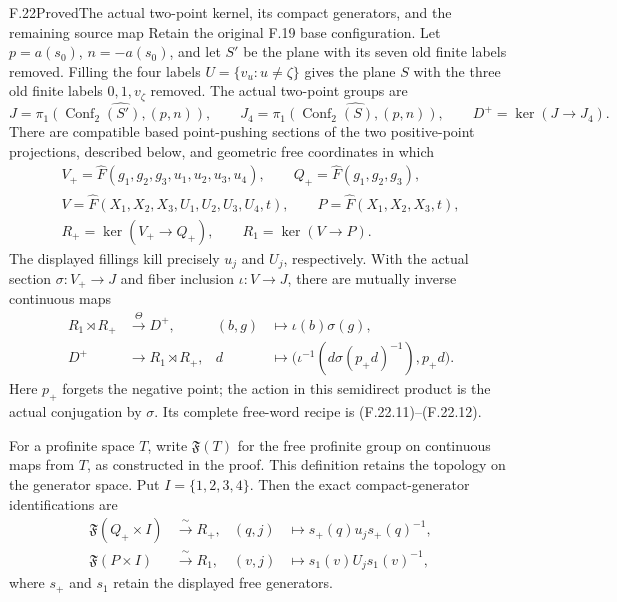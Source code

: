 \begin{claim}{F.22}{Proved}{The actual two-point kernel, its compact generators, and the remaining source map}
Retain the original F.19 base configuration. Let $p=a(s_0)$,
$n=-a(s_0)$, and let $S'$ be the plane with its seven old
finite labels removed. Filling the four labels
$U=\{v_u:u\ne\zeta\}$ gives the plane $S$ with the three
old finite labels $0,1,v_\zeta$ removed. The actual
two-point groups are
\[
 J=\widehat{\pi_1(\operatorname{Conf}_2(S'),(p,n))},\qquad
 J_4=\widehat{\pi_1(\operatorname{Conf}_2(S),(p,n))},\qquad
 D^+=\ker(J\to J_4).
                                                               \tag{F.22.1}
\]
There are compatible based point-pushing sections of the
two positive-point projections, described below, and
geometric free coordinates in which
\[
 \begin{gathered}
 V_+=\widehat F(g_1,g_2,g_3,u_1,u_2,u_3,u_4),\qquad
 Q_+=\widehat F(g_1,g_2,g_3),\\
 V=\widehat F(X_1,X_2,X_3,U_1,U_2,U_3,U_4,t),\qquad
 P=\widehat F(X_1,X_2,X_3,t),\\
 R_+=\ker(V_+\to Q_+),\qquad R_1=\ker(V\to P).
 \end{gathered}                                                \tag{F.22.2}
\]
The displayed fillings kill precisely $u_j$ and $U_j$,
respectively. With the actual section $\sigma:V_+\to J$
and fiber inclusion $\iota:V\to J$, there are mutually
inverse continuous maps
\[
 \begin{aligned}
 R_1\rtimes R_+&\xrightarrow{\ \Theta\ }D^+,
       &(b,g)&\longmapsto\iota(b)\sigma(g),\\
 D^+&\longrightarrow R_1\rtimes R_+,
       &d&\longmapsto
       \bigl(\iota^{-1}(d\sigma(p_+d)^{-1}),p_+d\bigr).
 \end{aligned}                                                \tag{F.22.3}
\]
Here $p_+$ forgets the negative point; the action in this
semidirect product is the actual conjugation by $\sigma$.
Its complete free-word recipe is (F.22.11)--(F.22.12).

For a profinite space $T$, write $\mathfrak F(T)$ for the
free profinite group on continuous maps from $T$, as
constructed in the proof. This definition retains the
topology on the generator space. Put $I=\{1,2,3,4\}$.
Then the exact compact-generator identifications are
\[
 \begin{aligned}
 \mathfrak F(Q_+\times I)&\xrightarrow{\ \sim\ }R_+,
       &(q,j)&\longmapsto s_+(q)u_js_+(q)^{-1},\\
 \mathfrak F(P\times I)&\xrightarrow{\ \sim\ }R_1,
       &(v,j)&\longmapsto s_1(v)U_js_1(v)^{-1},
 \end{aligned}                                                \tag{F.22.4}
\]
where $s_+$ and $s_1$ retain the displayed free generators.


\end{claim}
